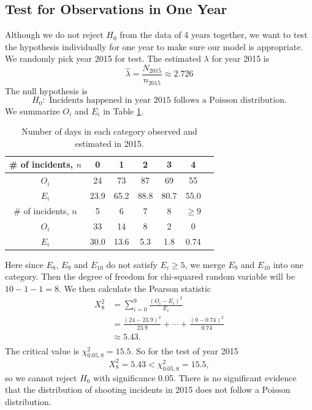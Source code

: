\documentclass[11pt,a4paper,english]{article}
\begin{document}
\subsection{Test for Observations in One Year}
Although we do not reject $H_{0}$ from the data of 4 years together, we want to test the hypothesis individually for one year to make sure our model is appropriate. We randomly pick year 2015 for test. The estimated $\lambda$ for year 2015 is 
\begin{equation*}
	\hat{\lambda} = \frac{N_{2015}}{n_{2015}} \approx 2.726
\end{equation*}
The null hypothesis is 
\[H_{0}:\text{ Incidents happened in year 2015 follows a Poisson distribution.}\]
We summarize $O_{i}$ and $E_{i}$ in Table \ref{tab:2015}.
\begin{table}[htbp]
    \centering
	\begin{tabular}{c|cccccc}
		\hline
        \# of incidents, $n$ & 0 & 1 & 2 & 3 & 4  \\
		\hline
		$O_{i}$ & 24 & 73 & 87 & 69 & 55 \\
		\hline
		$E_{i}$ & 23.9 & 65.2 & 88.8 & 80.7 & 55.0 \\ 
		\hline
		\hline
		\# of incidents, $n$ & 5 & 6 & 7 & 8 & $\geq 9$ \\
		\hline
		$O_{i}$ & 33 & 14 & 8 & 2 & 0 \\
		\hline
		$E_{i}$ & 30.0 & 13.6 & 5.3 & 1.8 & 0.74\\ 
		\hline 
    \end{tabular}
	\caption{Number of days in each category observed and estimated in 2015.}
	\label{tab:2015}
\end{table}
Here since $E_{8}$, $E_{9}$ and $E_{10}$ do not satisfy $E_{i} \geq 5$, we merge $E_{9}$ and $E_{10}$ into one category.
Then the degree of freedom for chi-squared random variable will be $10-1-1 = 8$.
We then calculate the Pearson statistic
\begin{align*}
	X_{8}^{2} &= \sum_{i = 0}^{9}\frac{(O_{i}-E_{i})^{2}}{E_{i}}\\
	&= \frac{(24-23.9)^{2}}{23.9}+\cdots+\frac{(0-0.74)^{2}}{0.74}\\
	&\approx 5.43.\\
\end{align*}
The critical value is $\chi_{0.05,8}^{2} = 15.5$.
So for the test of year 2015
\begin{equation*}
	X_{8}^{2} = 5.43 < \chi_{0.05,8}^{2} = 15.5,
\end{equation*}
so we cannot reject $H_{0}$ with significance 0.05.
There is no significant evidence that the distribution of shooting incidents in 2015 does not follow a Poisson distribution.
\end{document}
